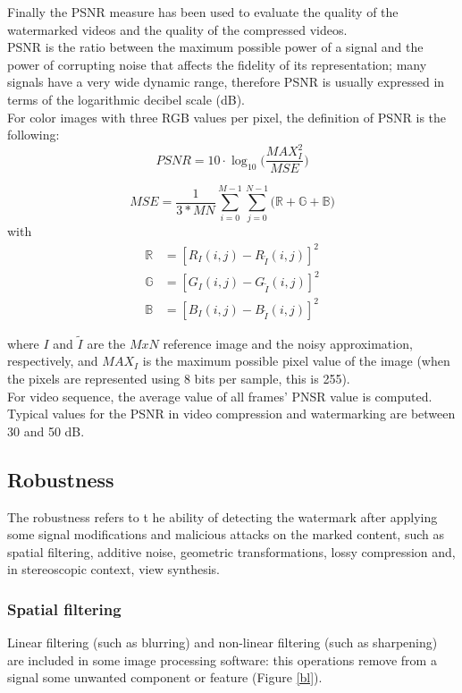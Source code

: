 Finally the PSNR measure has been used to evaluate the quality of the watermarked videos and the quality of the compressed videos.\\
PSNR is the ratio between the maximum possible power of a signal and the power of corrupting noise that affects the fidelity of its representation; many signals have a very wide dynamic range, therefore PSNR is usually expressed in terms of the logarithmic decibel scale (dB). \\
For color images with three RGB values per pixel, the definition of PSNR is the following:
\begin{equation}
PSNR = 10 \cdot \log_{10}\bigg( \frac{MAX_{I}^2}{MSE}\bigg)
\end{equation}

\begin{equation}
MSE  = \frac{1}{3*MN} \sum_{i=0}^{M-1}\sum_{j=0}^{N-1}\Big(\mathbb{R} +\mathbb{G} + \mathbb{B}  \Big)
\end{equation}
with 
\begin{align}
\mathbb{R} &= [R_{I}(i,j)-R_{\tilde{I}}(i,j)]^{2} \\
\mathbb{G} &= [G_{I}(i,j)-G_{\tilde{I}}(i,j)]^{2} \\
\mathbb{B} &= [B_{I}(i,j)-B_{\tilde{I}}(i,j)]^{2}
\end{align}

where $I$ and $\tilde{I}$ are the $MxN$ reference image and the noisy approximation, respectively, and $MAX_{I}$ is the maximum possible pixel value of the image (when the pixels are represented using 8 bits per sample, this is 255).\\
For video sequence, the average value of all frames' PNSR value is computed.
Typical values for the PSNR in video compression and watermarking are between 30 and 50 dB.

\subsection{Robustness}
The robustness refers to t he ability of detecting the watermark after applying some signal modifications
and malicious attacks on the marked content, such as spatial filtering, additive noise, geometric  transformations, lossy compression and, in stereoscopic context, view synthesis.

\subsubsection{Spatial filtering}
Linear filtering (such as blurring) and non-linear filtering (such as sharpening) are included in some image processing software: this operations remove from a signal some unwanted component or feature (Figure \ref{bl}).

